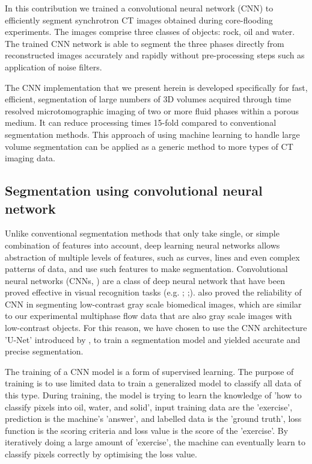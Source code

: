 \documentclass[draft,linenumbers]{agujournal2018}
\begin{document}
In this contribution we trained a convolutional neural network (CNN) to efficiently segment synchrotron \textmu CT images obtained during core-flooding experiments. The images comprise three classes of objects: rock, oil and water. The trained CNN network is able to segment the three phases directly from reconstructed images accurately and rapidly without pre-processing steps such as application of noise filters. 

The CNN implementation that we present herein is developed specifically for fast, efficient, segmentation of large numbers of 3D volumes acquired through time resolved microtomographic imaging of two or more fluid phases within a porous medium. It can reduce processing times 15-fold compared to conventional segmentation methods. This approach of using machine learning to handle large volume segmentation can be applied as a 
generic method to more types of \textmu CT imaging data.

\subsection{Segmentation using convolutional neural network}
Unlike conventional segmentation methods that only take single, or simple combination of features into account, deep learning neural networks allows abstraction of multiple levels of features, such as curves, lines and even complex patterns of data, and use such features to make segmentation. Convolutional neural networks (CNNs, \citet{lecun2015deep}) are a class of deep neural network that have been proved effective in visual recognition tasks (e.g. \citet{krizhevsky2012imagenet}; \citet{long2015fully};\citet{girshick2014rich}). \citet{ronneberger2015u} also proved the reliability of CNN in segmenting low-contrast gray scale biomedical images, which are similar to our experimental multiphase flow data that are also gray scale images with low-contrast objects. For this reason, we have chosen to use the CNN architecture 'U-Net' introduced by \citet{ronneberger2015u}, to train a segmentation model and yielded accurate and precise segmentation.

The training of a CNN model is a form of supervised learning. The purpose of training is to use limited data to train a generalized model to classify all data of this type. During training, the model is trying to learn the knowledge of 'how to classify pixels into oil, water, and solid', input training data are the 'exercise', prediction is the machine's 'answer', and labelled data is the 'ground truth', loss function is the scoring criteria and loss value is the score of the 'exercise'. By iteratively doing a large amount of 'exercise', the machine can eventually learn to classify pixels correctly by optimising the loss value.
\end{document}
